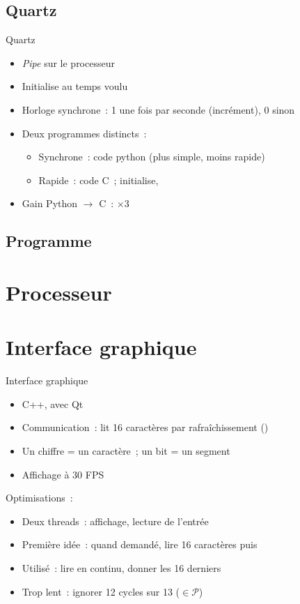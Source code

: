 \documentclass[11pt]{beamer}
\begin{document}
\subsection{Quartz}

\begin{frame}{Quartz}
\begin{itemize}
\item \textit{Pipe} sur le processeur
\item Initialise au temps voulu
\item Horloge synchrone~: \alert{1} une fois par seconde (incrément), \alert{0} sinon
\item Deux programmes distincts~:
	\begin{itemize}
	\item Synchrone~: code python (plus simple, moins rapide)
	\item Rapide~: code C~; initialise, 
	\end{itemize}
\item Gain Python $\rightarrow$ C~: $\times 3$
\end{itemize}
\end{frame}

\subsection{Programme}



\section{Processeur}



\section{Interface graphique}

\begin{frame}{Interface graphique}
\begin{itemize}
\item C++, avec Qt
\item Communication~: lit 16 caractères par rafraîchissement ()
\item Un chiffre = un caractère~; un bit = un segment
\item Affichage à 30 FPS
\end{itemize}

\noindent Optimisations~:
\begin{itemize}
\item \alert{Deux threads}~: affichage, lecture de l'entrée
\item Première idée~: quand demandé, lire 16 caractères puis 
\item Utilisé~: lire en continu, donner les 16 derniers
\item Trop lent~: ignorer \alert{12 cycles sur 13} ($\in \mathcal{P}$)
\end{itemize}
\end{frame}
\end{document}
